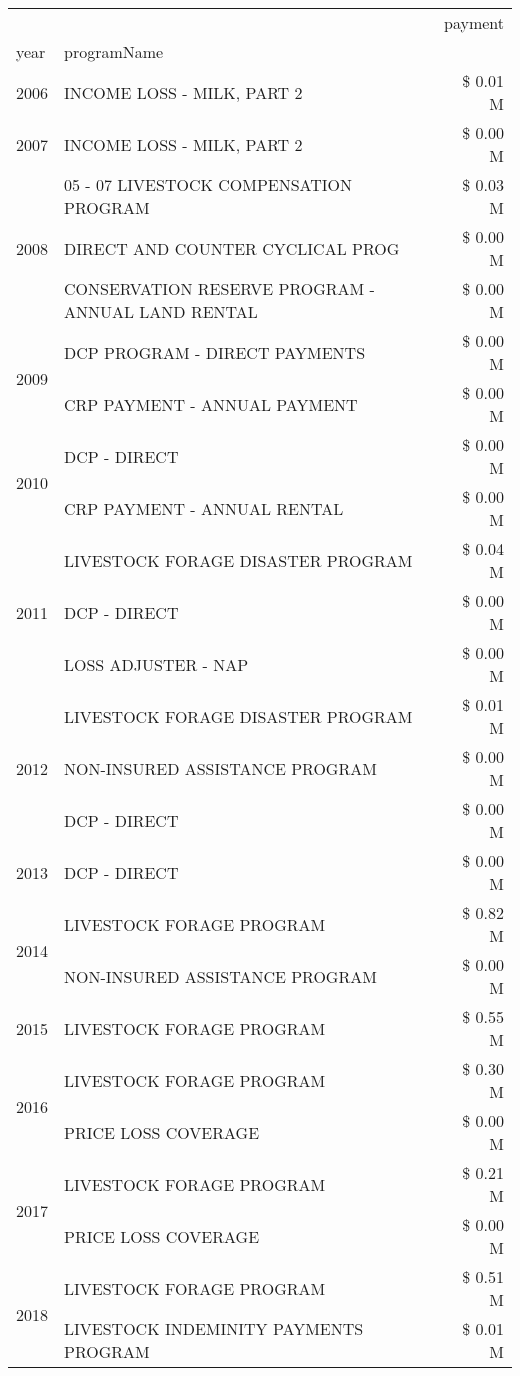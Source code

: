 \begin{tabular}{llr}
\toprule
 &  & payment \\
year & programName &  \\
\midrule
2006 & INCOME LOSS - MILK, PART 2 & \$ 0.01 M \\
\cline{1-3}
2007 & INCOME LOSS - MILK, PART 2 & \$ 0.00 M \\
\cline{1-3}
\multirow[t]{3}{*}{2008} & 05 - 07 LIVESTOCK COMPENSATION PROGRAM & \$ 0.03 M \\
 & DIRECT AND COUNTER CYCLICAL PROG & \$ 0.00 M \\
 & CONSERVATION RESERVE PROGRAM - ANNUAL LAND RENTAL & \$ 0.00 M \\
\cline{1-3}
\multirow[t]{2}{*}{2009} & DCP PROGRAM - DIRECT PAYMENTS & \$ 0.00 M \\
 & CRP PAYMENT - ANNUAL PAYMENT & \$ 0.00 M \\
\cline{1-3}
\multirow[t]{2}{*}{2010} & DCP - DIRECT & \$ 0.00 M \\
 & CRP PAYMENT - ANNUAL RENTAL & \$ 0.00 M \\
\cline{1-3}
\multirow[t]{3}{*}{2011} & LIVESTOCK FORAGE DISASTER PROGRAM & \$ 0.04 M \\
 & DCP - DIRECT & \$ 0.00 M \\
 & LOSS ADJUSTER - NAP & \$ 0.00 M \\
\cline{1-3}
\multirow[t]{3}{*}{2012} & LIVESTOCK FORAGE DISASTER PROGRAM & \$ 0.01 M \\
 & NON-INSURED ASSISTANCE PROGRAM & \$ 0.00 M \\
 & DCP - DIRECT & \$ 0.00 M \\
\cline{1-3}
2013 & DCP - DIRECT & \$ 0.00 M \\
\cline{1-3}
\multirow[t]{2}{*}{2014} & LIVESTOCK FORAGE PROGRAM & \$ 0.82 M \\
 & NON-INSURED ASSISTANCE PROGRAM & \$ 0.00 M \\
\cline{1-3}
2015 & LIVESTOCK FORAGE PROGRAM & \$ 0.55 M \\
\cline{1-3}
\multirow[t]{2}{*}{2016} & LIVESTOCK FORAGE PROGRAM & \$ 0.30 M \\
 & PRICE LOSS COVERAGE & \$ 0.00 M \\
\cline{1-3}
\multirow[t]{2}{*}{2017} & LIVESTOCK FORAGE PROGRAM & \$ 0.21 M \\
 & PRICE LOSS COVERAGE & \$ 0.00 M \\
\cline{1-3}
\multirow[t]{3}{*}{2018} & LIVESTOCK FORAGE PROGRAM & \$ 0.51 M \\
 & LIVESTOCK INDEMINITY PAYMENTS PROGRAM & \$ 0.01 M \\

\end{tabular}
